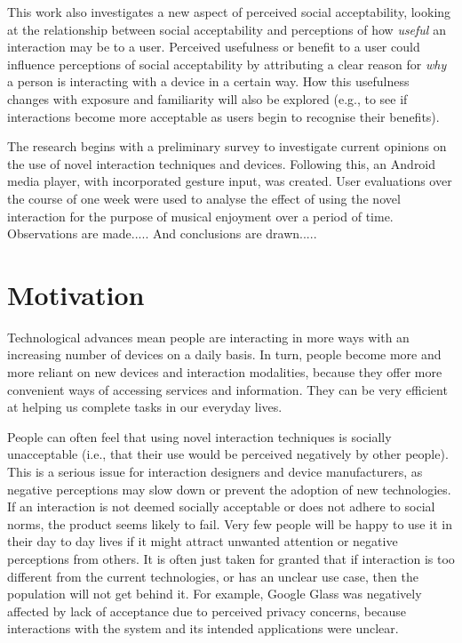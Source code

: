 \documentclass{l4proj}
\begin{document}
This work also investigates a new aspect of perceived social acceptability, looking at the relationship between social acceptability and perceptions of how \textit{useful} an interaction may be to a user. Perceived usefulness or benefit to a user could influence perceptions of social acceptability by attributing a clear reason for \textit{why} a person is interacting with a device in a certain way. How this usefulness changes with exposure and familiarity will also be explored (e.g., to see if interactions become more acceptable as users begin to recognise their benefits).

The research begins with a preliminary survey to investigate current opinions on the use of novel interaction techniques and devices. Following this, an Android media player, with incorporated gesture input, was created. User evaluations over the course of one week were used to analyse the effect of using the novel interaction for the purpose of musical enjoyment over a period of time. Observations are made..... And conclusions are drawn.....


\section{Motivation}
Technological advances mean people are interacting in more ways with an increasing number of devices on a daily basis. In turn, people become more and more reliant on new devices and interaction modalities, because they offer more convenient ways of accessing services and information. They can be very efficient at helping us complete tasks in our everyday lives. 

People can often feel that using novel interaction techniques is socially unacceptable (i.e., that their use would be perceived negatively by other people). This is a serious issue for interaction designers and device manufacturers, as negative perceptions may slow down or prevent the adoption of new technologies. If an interaction is not deemed socially acceptable or does not adhere to social norms, the product seems likely to fail. Very few people will be happy to use it in their day to day lives if it might attract unwanted attention or negative perceptions from others.  It is often just taken for granted that if interaction is too different from the current technologies, or has an unclear use case, then the population will not get behind it. For example, Google Glass was negatively affected by lack of acceptance due to perceived privacy concerns, because interactions with the system and its intended applications were unclear.
\end{document}
